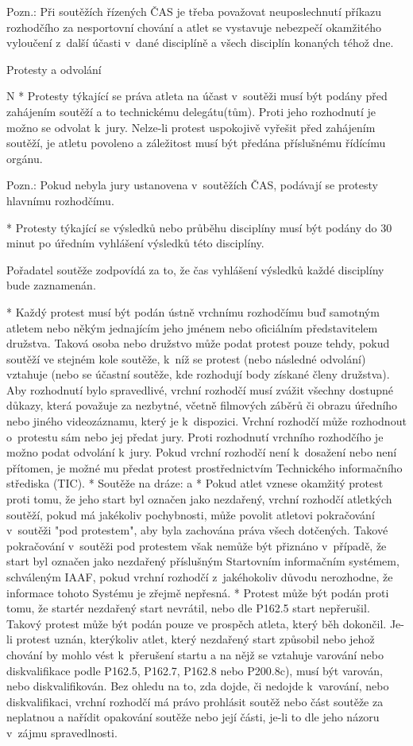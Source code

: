 Pozn.: Při soutěžích řízených ČAS je třeba považovat neuposlechnutí příkazu rozhodčího za nesportovní chování a atlet se vystavuje nebezpečí okamžitého vyloučení z~další účasti v~dané disciplíně a všech disciplín konaných téhož dne.
\enditems

\secc Protesty a odvolání

\begitems \style N
* Protesty týkající se práva atleta na účast v~soutěži musí být podány před zahájením soutěží a to technickému delegátu(tům). Proti jeho rozhodnutí je možno se odvolat k~jury. Nelze-li protest uspokojivě vyřešit před zahájením soutěží, je atletu povoleno  a záležitost musí být předána příslušnému řídícímu orgánu.

Pozn.: Pokud nebyla jury ustanovena v~soutěžích ČAS, podávají se protesty hlavnímu rozhodčímu.

* Protesty týkající se výsledků nebo průběhu disciplíny musí být podány do 30 minut po úředním vyhlášení výsledků této disciplíny.

Pořadatel soutěže zodpovídá za to, že čas vyhlášení výsledků každé disciplíny bude zaznamenán.

* Každý protest musí být podán ústně vrchnímu rozhodčímu buď samotným atletem nebo někým jednajícím jeho jménem nebo oficiálním představitelem družstva. Taková osoba nebo družstvo může podat protest pouze tehdy, pokud soutěží ve stejném kole soutěže, k~níž se protest (nebo následné odvolání) vztahuje (nebo se účastní soutěže, kde rozhodují body získané členy družstva). Aby rozhodnutí bylo spravedlivé, vrchní rozhodčí musí zvážit všechny dostupné důkazy, která považuje za nezbytné, včetně filmových záběrů či obrazu úředního nebo jiného videozáznamu, který je k~dispozici. Vrchní rozhodčí může rozhodnout o~protestu sám nebo jej předat jury. Proti rozhodnutí vrchního rozhodčího je možno podat odvolání k~jury. Pokud vrchní rozhodčí není k~dosažení nebo není přítomen, je možné mu předat protest prostřednictvím Technického informačního střediska (TIC).
* Soutěže na dráze:
  \begitems \style a
  * Pokud atlet vznese okamžitý protest proti tomu, že jeho start byl označen jako nezdařený, vrchní rozhodčí atletkých soutěží, pokud má jakékoliv pochybnosti, může povolit atletovi pokračování v~soutěži "pod protestem", aby byla zachována práva všech dotčených. Takové pokračování v~soutěži pod protestem však nemůže být přiznáno v~případě, že start byl označen jako nezdařený příslušným Startovním informačním systémem, schváleným IAAF, pokud vrchní rozhodčí z~jakéhokoliv důvodu nerozhodne, že informace tohoto Systému je zřejmě nepřesná.
  * Protest může být podán proti tomu, že startér nezdařený start nevrátil, nebo dle P162.5 start nepřerušil. Takový protest může být podán pouze ve prospěch atleta, který běh dokončil. Je-li protest uznán, kterýkoliv atlet, který nezdařený start způsobil nebo jehož chování by mohlo vést k~přerušení startu a na nějž se vztahuje varování nebo diskvalifikace podle P162.5, P162.7, P162.8 nebo P200.8c), musí být varován, nebo diskvalifikován. Bez ohledu na to, zda dojde, či nedojde k~varování, nebo diskvalifikaci, vrchní rozhodčí má právo prohlásit soutěž nebo část soutěže za neplatnou a nařídit opakování soutěže nebo její části, je-li to dle jeho názoru v~zájmu spravedlnosti.

